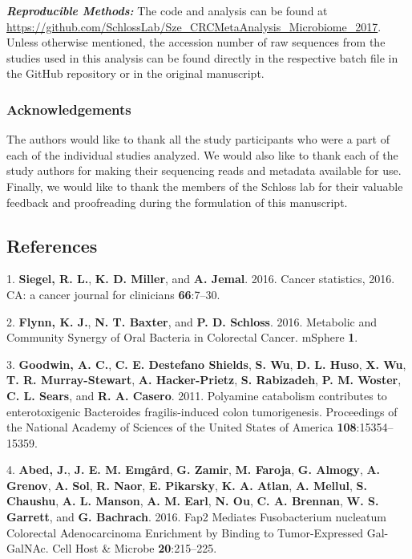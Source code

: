 \documentclass[12pt,]{article}
\begin{document}
\textbf{\emph{Reproducible Methods:}} The code and analysis can be found
at
\url{https://github.com/SchlossLab/Sze_CRCMetaAnalysis_Microbiome_2017}.
Unless otherwise mentioned, the accession number of raw sequences from
the studies used in this analysis can be found directly in the
respective batch file in the GitHub repository or in the original
manuscript.

\newpage

\subsubsection{Acknowledgements}\label{acknowledgements}

The authors would like to thank all the study participants who were a
part of each of the individual studies analyzed. We would also like to
thank each of the study authors for making their sequencing reads and
metadata available for use. Finally, we would like to thank the members
of the Schloss lab for their valuable feedback and proofreading during
the formulation of this manuscript.

\newpage

\subsection{References}\label{references}

\hypertarget{refs}{}
\hypertarget{ref-siegel_cancer_2016}{}
1. \textbf{Siegel, R. L.}, \textbf{K. D. Miller}, and \textbf{A. Jemal}.
2016. Cancer statistics, 2016. CA: a cancer journal for clinicians
\textbf{66}:7--30.

\hypertarget{ref-flynn_metabolic_2016}{}
2. \textbf{Flynn, K. J.}, \textbf{N. T. Baxter}, and \textbf{P. D.
Schloss}. 2016. Metabolic and Community Synergy of Oral Bacteria in
Colorectal Cancer. mSphere \textbf{1}.

\hypertarget{ref-goodwin_polyamine_2011}{}
3. \textbf{Goodwin, A. C.}, \textbf{C. E. Destefano Shields}, \textbf{S.
Wu}, \textbf{D. L. Huso}, \textbf{X. Wu}, \textbf{T. R. Murray-Stewart},
\textbf{A. Hacker-Prietz}, \textbf{S. Rabizadeh}, \textbf{P. M. Woster},
\textbf{C. L. Sears}, and \textbf{R. A. Casero}. 2011. Polyamine
catabolism contributes to enterotoxigenic Bacteroides fragilis-induced
colon tumorigenesis. Proceedings of the National Academy of Sciences of
the United States of America \textbf{108}:15354--15359.

\hypertarget{ref-abed_fap2_2016}{}
4. \textbf{Abed, J.}, \textbf{J. E. M. Emgård}, \textbf{G. Zamir},
\textbf{M. Faroja}, \textbf{G. Almogy}, \textbf{A. Grenov}, \textbf{A.
Sol}, \textbf{R. Naor}, \textbf{E. Pikarsky}, \textbf{K. A. Atlan},
\textbf{A. Mellul}, \textbf{S. Chaushu}, \textbf{A. L. Manson},
\textbf{A. M. Earl}, \textbf{N. Ou}, \textbf{C. A. Brennan}, \textbf{W.
S. Garrett}, and \textbf{G. Bachrach}. 2016. Fap2 Mediates Fusobacterium
nucleatum Colorectal Adenocarcinoma Enrichment by Binding to
Tumor-Expressed Gal-GalNAc. Cell Host \& Microbe \textbf{20}:215--225.
\end{document}

